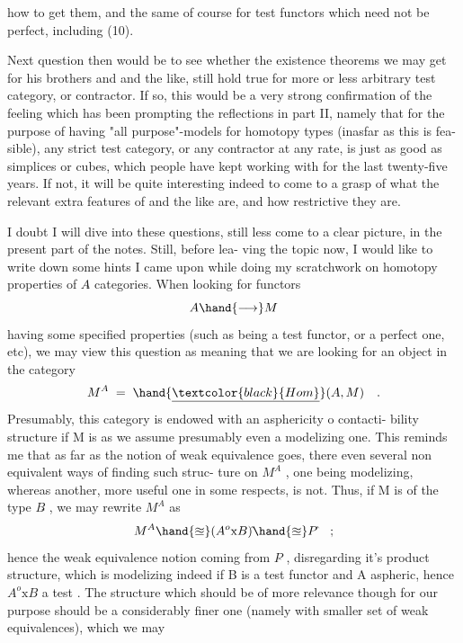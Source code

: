 
how to get them, and the same of course for test functors which need not
be perfect, including (10).

Next question then would be to see whether the existence theorems
we may get for \hand{$\Delta$}\hand{,}  his brothers \hand{$\square$} and \hand{\unsure{$\bigcirc$}} and the like, still hold
true for more or less arbitrary test category, or contractor. If so,
this would be a very strong confirmation of the feeling which has been
prompting the reflections in part II, namely that for the purpose of
having "all purpose"-models for homotopy types (inasfar as this is fea-%
sible), any strict test category, or any contractor at any rate, is
just as good as simplices or cubes, which people have kept working with
for the last twenty-five years. If not, it will be quite interesting
indeed to come to a grasp of what the relevant extra features of \hand{$\Delta$} and
the like are, and how restrictive they are.

I doubt I will dive into these questions, still less come to a
clear picture, in the present part of the notes. Still, before lea-%
ving the topic now, I would like to write down some hints\deleted{\unsure{,}} I came
upon while doing my scratchwork on homotopy properties of $A\hat{}$ categories.
When looking for functors
\[ A \hand{\longrightarrow} M \]
having some specified properties (such as being a test functor, or a
perfect one, etc), we may view this question as meaning that we are
looking for an object  in the category
\[ M^A \;=\; \hand{\underline{\textcolor{black}{Hom}}}(A,M) \quad . \]
Presumably, this category is endowed with an asphericity o contacti-%
bility structure if M is\deleted{,} \hand{(}as we assume\hand{)}\hand{,} presumably even a modelizing
one. This reminds me that as far as the notion of weak equivalence
goes, there  even several non equivalent ways of finding such struc-%
ture on $M^A$ , one being modelizing, whereas another, more useful one
in some respects, is not. Thus, if M is of the type $B\hat{}$ , we may
rewrite $M^A$ as
\[ M^A \hand{\approxeq} (A^{o}\mathrm{x}B)\hat{} \hand{\approxeq} P\hat{} \quad ; \]
hence  the weak equivalence notion coming from $P\hat{}$ , disregarding it's
product structure, which is modelizing indeed if B is a test functor
and A aspheric, hence $A^{o}\mathrm{x}B$ a test . The structure which should
be of more relevance though for our purpose should be a considerably
finer one (namely with smaller set of weak equivalences), which we may


